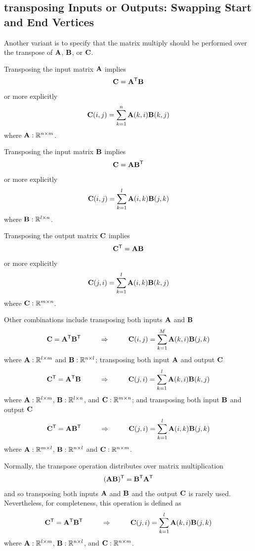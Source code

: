 \subsection{transposing Inputs or Outputs: Swapping Start and End Vertices}

Another variant is to specify that the matrix multiply should be performed over the transpose of  ${\bf A}$, ${\bf B}$, or ${\bf C}$.

Transposing the input matrix ${\bf A}$ implies
$$
   {\bf C} = {\bf A}^{\sf T} {\bf B}
$$
or more explicitly
$$
   {\bf C}(i,j) = \sum_{k=1}^n {\bf A}(k,i) {\bf B}(k,j)
$$
where ${\bf A}: \mathbb{R}^{n \times m}$.

Transposing the input matrix ${\bf B}$ implies
$$
   {\bf C} = {\bf A} {\bf B}^{\sf T}
$$
or more explicitly
$$
   {\bf C}(i,j) = \sum_{k=1}^l {\bf A}(i,k) {\bf B}(j,k)
$$
where ${\bf B}: \mathbb{R}^{l \times n}$.


Transposing the output matrix ${\bf C}$ implies
$$
   {\bf C}^{\sf T} = {\bf A} {\bf B}
$$
or more explicitly
$$
   {\bf C}(j,i) = \sum_{k=1}^l {\bf A}(i,k) {\bf B}(k,j)
$$
where ${\bf C}: \mathbb{R}^{m \times n}$.

Other combinations include transposing both inputs ${\bf A}$ and ${\bf B}$
$$
   {\bf C} = {\bf A}^{\sf T} {\bf B}^{\sf T} ~~~~~~~~ \Rightarrow ~~~~~~~~ {\bf C}(i,j) = \sum_{k=1}^M {\bf A}(k,i) {\bf B}(j,k)
$$
where ${\bf A}: \mathbb{R}^{l \times m}$ and ${\bf B}: \mathbb{R}^{n \times l}$; transposing both input ${\bf A}$ and output ${\bf C}$
$$
   {\bf C}^{\sf T} = {\bf A}^{\sf T} {\bf B} ~~~~~~~~ \Rightarrow ~~~~~~~~ {\bf C}(j,i) = \sum_{k=1}^l {\bf A}(k,i) {\bf B}(k,j)
$$
where ${\bf A}: \mathbb{R}^{l \times m}$, ${\bf B}: \mathbb{R}^{l \times n}$, and ${\bf C}: \mathbb{R}^{m \times n}$; and transposing both input ${\bf B}$ and output ${\bf C}$
$$
   {\bf C}^{\sf T} = {\bf A} {\bf B}^{\sf T} ~~~~~~~~ \Rightarrow ~~~~~~~~ {\bf C}(j,i) = \sum_{k=1}^l {\bf A}(i,k) {\bf B}(j,k)
$$
where ${\bf A}: \mathbb{R}^{m \times l}$, ${\bf B}: \mathbb{R}^{n \times l}$ and ${\bf C}: \mathbb{R}^{n \times m}$.

Normally, the transpose operation distributes over matrix multiplication
$$
({\bf A} {\bf B})^{\sf T} ={\bf B}^{\sf T} {\bf A}^{\sf T}
$$
and so transposing both inputs ${\bf A}$ and ${\bf B}$ and the output ${\bf C}$ is rarely used.  Nevertheless, for completeness, this operation is defined as
$$
   {\bf C}^{\sf T} = {\bf A}^{\sf T} {\bf B}^{\sf T} ~~~~~~~~ \Rightarrow ~~~~~~~~ {\bf C}(j,i) = \sum_{k=1}^l {\bf A}(k,i) {\bf B}(j,k)
$$
where ${\bf A}: \mathbb{R}^{l \times m}$, ${\bf B}: \mathbb{R}^{n \times l}$, and ${\bf C}: \mathbb{R}^{n \times m}$.

